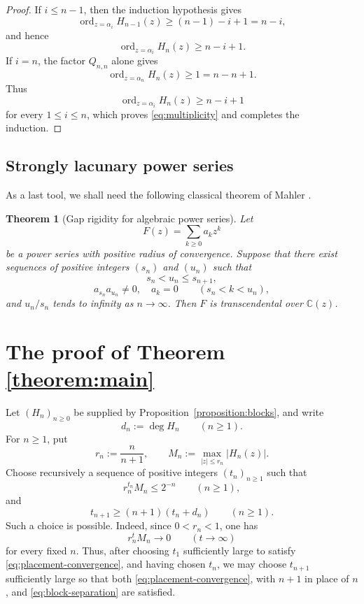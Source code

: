 \documentclass[10pt,a4paper]{amsart}
\newtheorem{theorem}{Theorem}[section]
\numberwithin{equation}{section}
\newcommand{\C}{\mathbb C}
\newcommand{\abs}[1]{\lvert #1\rvert}
\newcommand{\ord}{\operatorname{ord}}
\begin{document}
\begin{proof}
If $i\leq n-1$, then the induction hypothesis gives
\[
        \ord_{z=\alpha_i}H_{n-1}(z)
        \geq
        (n-1)-i+1
        =
        n-i,
\]
and hence
\[
        \ord_{z=\alpha_i}H_n(z)
        \geq
        n-i+1.
\]
If $i=n$, the factor $Q_{n,n}$ alone gives
\[
        \ord_{z=\alpha_n}H_n(z)
        \geq1
        =
        n-n+1.
\]
Thus
\[
        \ord_{z=\alpha_i}H_n(z)\geq n-i+1
\]
for every $1\leq i\leq n$, which proves
\eqref{eq:multiplicity} and completes the induction.
\end{proof}


\subsection{Strongly lacunary power series}

As a last tool, we shall need the following classical theorem of Mahler
\cite[Chapter~II]{mahler1976}.

\begin{theorem}[Gap rigidity for algebraic power series]\label{theorem:mahler-lacunary}
Let
\[
        F(z)=\sum_{k\geq0}a_kz^k
\]
be a power series with positive radius of convergence. Suppose that there exist sequences of positive
integers $(s_n)$ and $(u_n)$ such that
\[
        s_n<u_n\leq s_{n+1},
\]
\[
       a_{s_n}a_{u_n}\neq 0, \quad a_k=0
        \qquad(s_n<k<u_n),
\]
and $u_n/s_n$ tends to infinity as $n\to \infty$. Then $F$ is transcendental over $\C(z)$.
\end{theorem}

\section{The proof of Theorem \ref{theorem:main}}

Let $(H_n)_{n\geq0}$ be supplied by Proposition~\ref{proposition:blocks},
and write
\[
        d_n:=\deg H_n
        \qquad(n\geq1).
\]
For $n\geq1$, put
\[
        r_n:=\frac{n}{n+1},
        \qquad
        M_n:=\max_{\abs z\leq r_n}\abs{H_n(z)}.
\]
Choose recursively a sequence of positive integers $(t_n)_{n\geq1}$ such that
\begin{equation}\label{eq:placement-convergence}
        r_n^{t_n}M_n\leq 2^{-n}
        \qquad(n\geq1),
\end{equation}
and
\begin{equation}\label{eq:block-separation}
        t_{n+1}\geq (n+1)(t_n+d_n)
        \qquad(n\geq1).
\end{equation}
Such a choice is possible. Indeed, since $0<r_n<1$, one has
\[
        r_n^tM_n\longrightarrow0
        \qquad(t\to\infty)
\]
for every fixed $n$. Thus, after choosing $t_1$ sufficiently large to
satisfy \eqref{eq:placement-convergence}, and having chosen $t_n$, we may
choose $t_{n+1}$ sufficiently large so that both
\eqref{eq:placement-convergence}, with $n+1$ in place of $n$, and
\eqref{eq:block-separation} are satisfied.
\end{document}
